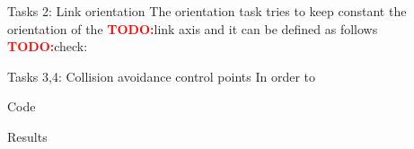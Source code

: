 \documentclass[11pt]{beamer}
\newcommand{\todo}{\textcolor{red}{\textbf{TODO:}}}
\begin{document}
\begin{frame}{Tasks 2: Link orientation}
The orientation task tries to keep constant the orientation of the \todo link axis and it can be defined as follows \todo check:
\end{frame}

\begin{frame}{Tasks 3,4: Collision avoidance control points}
In order to 
\end{frame}

\begin{frame}{Code}

\end{frame}

\begin{frame}{Results}

\end{frame}
\end{document}
